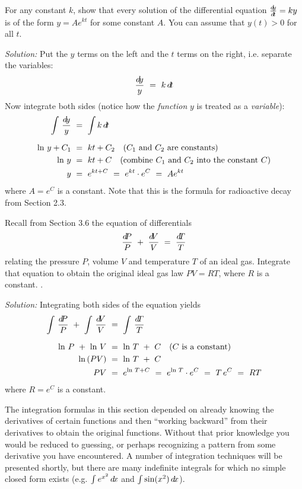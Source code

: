 \begin{exmp}\label{exmp:intdecay}
\noindent For any constant $k$, show that every solution of the differential
equation $\frac{d\negmedspace y}{d\!t} = ky$ is of the form $y = Ae^{kt}$ for some constant
$A$. You can assume that $y(t) > 0$ for all $t$.\vspace{1mm}
\par\noindent\emph{Solution:} Put the $y$ terms on the left and the $t$ terms on
the right, i.e. separate the variables:
\[
\frac{d\!y}{y} ~=~ k\,d\!t
\]
Now integrate both sides (notice how the \emph{function} $y$ is treated as a
\emph{variable}):
\begin{align*}
\int\,\frac{d\!y}{y} ~&=~ \int k\,d\!t\\[6pt]
\ln\,y  + C_1 ~&=~ kt + C_2 \quad\text{($C_1$ and $C_2$ are constants)}\\
\ln\,y  ~&=~ kt + C \quad\text{(combine $C_1$ and $C_2$ into the constant $C$)}\\
y ~&=~ e^{kt+C} ~=~ e^{kt} \cdot e^C ~=~ A e^{kt}
\end{align*}
where $A = e^C$ is a constant. Note that this is the formula for radioactive
decay from Section 2.3.
\end{exmp}
\begin{exmp}\label{exmp:intidealgas}
\noindent Recall from Section 3.6 the equation of differentials
\[
\dfrac{d\negmedspace P}{P} ~+~ \dfrac{d\negmedspace V}{V} ~=~ \dfrac{d\negmedspace T}{T}
\]
relating the pressure $P$, volume $V$ and temperature $T$ of an ideal gas.
Integrate that equation to obtain the original ideal gas law $PV = RT$, where
$R$ is a constant.
.\vspace{1mm}
\par\noindent\emph{Solution:} Integrating both sides of the equation yields
\begin{align*}
\int\,\dfrac{d\negmedspace P}{P} ~+~ \int\,\dfrac{d\negmedspace V}{V} ~&=~ \int\,\dfrac{d\negmedspace T}{T}\\[6pt]
\ln\,P ~+~ \ln\,V ~&=~ \ln\,T ~+~ C \quad\text{($C$ is a constant)}\\
\ln\,(PV) ~&=~ \ln\,T ~+~ C\\
PV ~&=~ e^{\ln\,T + C} ~=~ e^{\ln\,T} \cdot e^{C} ~=~ T\,e^C ~=~ RT
\end{align*}
where $R = e^C$ is a constant.\quad\checkmark
\end{exmp}\vspace{-1mm}
\divider
\vspace{2mm}

The integration formulas in this section depended on already knowing the
derivatives of certain functions and then ``working backward'' from their
derivatives to obtain the original functions. Without that prior knowledge you
would be reduced to guessing, or perhaps recognizing a pattern from some
derivative you have encountered. A number of integration techniques will be
presented shortly, but there are many indefinite integrals for which no simple
closed form exists (e.g. $\int e^{x^2}\,d\!x$ and
$\int \sin(x^2)\,d\!x$).\vspace{2mm}

